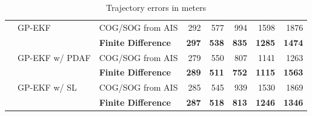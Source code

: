 \begin{table}[b]
\begin{subtable}{\textwidth}
{\begin{tabular}{lllrrrrr}
                        & GP-EKF         & COG/SOG from AIS      & 292     & 577     & 994      & 1598     & 1876     \\
                        &                & \bf Finite Difference & \bf 297 & \bf 538 & \bf 835  & \bf 1285 & \bf 1474 \\
                        & GP-EKF w/ PDAF & COG/SOG from AIS      & 279     & 550     & 807      & 1141     & 1263     \\
                        &                & \bf Finite Difference & \bf 289 & \bf 511 & \bf 752  & \bf 1115 & \bf 1563 \\
                        & GP-EKF w/ SL   & COG/SOG from AIS      & 285     & 545     & 939      & 1530     & 1869     \\
                        &                & \bf Finite Difference & \bf 287 & \bf 518 & \bf 813  & \bf 1246 & \bf 1346 \\
                \bottomrule
            \end{tabular}
        }
        \caption{Trajectory errors in meters}
        \label{table:stats_straight_traj_err}
        \vspace*{0.5cm}
    \end{subtable}
    \begin{subtable}{\textwidth}
\end{subtable}
\end{table}
